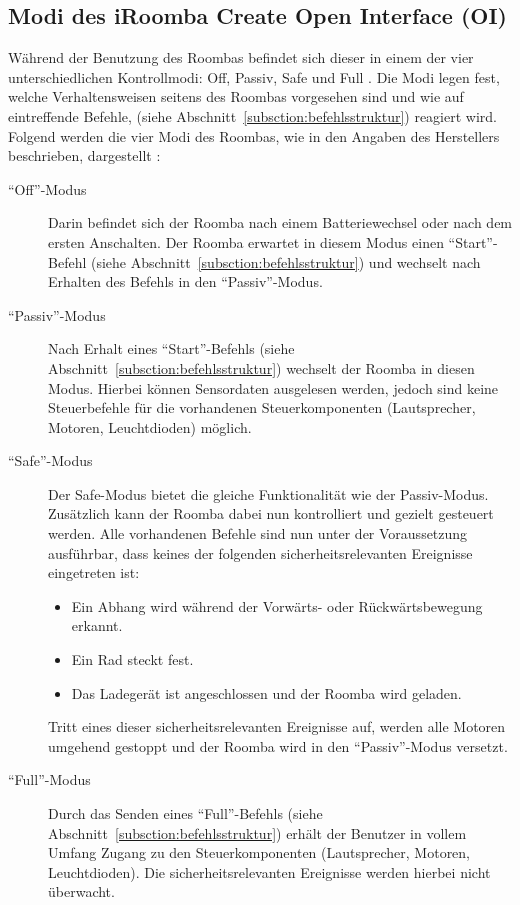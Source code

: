 \subsection{Modi des iRoomba Create Open Interface (OI)}
Während der Benutzung des Roombas befindet sich dieser in einem der vier unterschiedlichen Kontrollmodi: Off, Passiv, Safe und Full \cite{IRobot2010}. Die Modi legen fest, welche Verhaltensweisen seitens des Roombas vorgesehen sind und wie auf eintreffende Befehle, (siehe Abschnitt~\ref{subsction:befehlsstruktur}) reagiert wird. Folgend werden die vier Modi des Roombas, wie in den Angaben des Herstellers beschrieben,
dargestellt \cite{IRobot2010}:
\begin{description}
\item[\enquote{Off}-Modus] Darin befindet sich der Roomba nach einem Batteriewechsel oder nach dem ersten Anschalten. Der Roomba erwartet in diesem Modus einen \enquote{Start}-Befehl (siehe Abschnitt~\ref{subsction:befehlsstruktur}) und wechselt nach Erhalten des Befehls in den \enquote{Passiv}-Modus.

\item[\enquote{Passiv}-Modus] Nach Erhalt eines \enquote{Start}-Befehls (siehe Abschnitt~\ref{subsction:befehlsstruktur}) wechselt der Roomba in diesen Modus. Hierbei können Sensordaten ausgelesen werden, jedoch sind keine Steuerbefehle für die vorhandenen Steuerkomponenten (Lautsprecher, Motoren, Leuchtdioden) möglich. 

\item[\enquote{Safe}-Modus] Der Safe-Modus bietet die gleiche Funktionalität wie der Passiv-Modus. Zusätzlich kann der Roomba dabei nun kontrolliert und gezielt gesteuert werden. Alle vorhandenen Befehle sind nun unter der Voraussetzung ausführbar, dass keines der folgenden sicherheitsrelevanten Ereignisse eingetreten ist: 
\begin{itemize}
\item Ein Abhang wird während der Vorwärts- oder Rückwärtsbewegung erkannt.
\item Ein Rad steckt fest.
\item Das Ladegerät ist angeschlossen und der Roomba wird geladen.
\end{itemize}
Tritt eines dieser sicherheitsrelevanten Ereignisse auf, werden alle Motoren umgehend gestoppt und der Roomba wird in den \enquote{Passiv}-Modus versetzt.

\item[\enquote{Full}-Modus] Durch das Senden eines \enquote{Full}-Befehls (siehe Abschnitt~\ref{subsction:befehlsstruktur}) erhält der Benutzer in vollem Umfang Zugang zu den Steuerkomponenten (Lautsprecher, Motoren, Leuchtdioden). Die sicherheitsrelevanten Ereignisse werden hierbei nicht überwacht.
\end{description}

